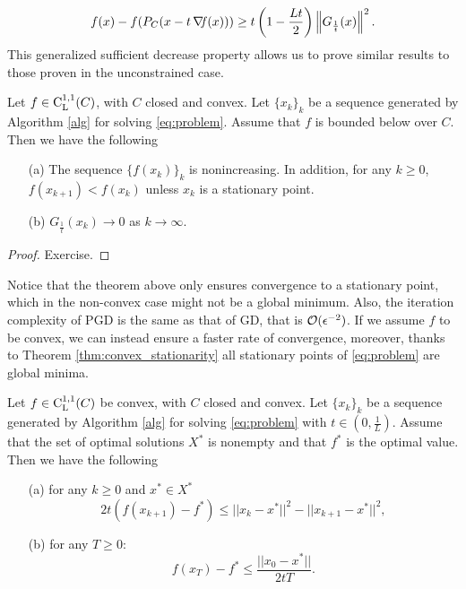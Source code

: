 \documentclass[10pt,a4paper]{article}
\begin{document}
\begin{equation*}
	f(x)-f(P_C(x-t\operatorname*{\mathit{\nabla \!f}}(x))) \geq t\left(1- \frac{Lt}{2}\right) \left\| G_{\frac{1}{t}} (x) \right\|^2.
\end{equation*}
This generalized sufficient decrease property allows us to prove similar results to those proven in the unconstrained case.
\begin{theorem}
	Let $f\in \mathord{\mathrm{C^{1,1}_{L}}}(C)$, with $C$ closed and convex. Let $\{x_k\}_k$ be a sequence generated by Algorithm \ref{alg} for solving \eqref{eq:problem}. Assume that $f$ is bounded below over $C$. Then we have the following
	\begin{itemize}
		\item[(a)] The sequence $\{f(x_k)\}_k$ is nonincreasing. In addition, for any $k\geq 0$, $f(x_{k+1}) < f(x_k)$ unless $x_k$ is a stationary point.
		\item[(b)] $G_{\frac{1}{t}}(x_k) \to 0$ as $k\to \infty$.
	\end{itemize}
\end{theorem}
\begin{proof}
	Exercise.
\end{proof}
\noindent Notice that the theorem above only ensures convergence to a stationary point, which in the non-convex case might not be a global minimum. Also, the iteration complexity of PGD is the same as that of GD, that is $\mathcal{O}(\epsilon^{-2})$. If we assume $f$ to be convex, we can instead ensure a faster rate of convergence, moreover, thanks to Theorem \ref{thm:convex_stationarity} all stationary points of \eqref{eq:problem} are global minima.
\begin{theorem}
	Let $f\in \mathord{\mathrm{C^{1,1}_{L}}}(C)$ be convex, with $C$ closed and convex. Let $\{x_k\}_k$ be a sequence generated by Algorithm \ref{alg} for solving \eqref{eq:problem} with $t\in (0,\frac{1}{L})$. Assume that the set of optimal solutions $X^*$ is nonempty and that $f^*$ is the optimal value. Then we have the following
	\begin{itemize}
		\item[(a)] for any $k\geq0$ and $x^*\in X^*$
		\begin{equation*}
			2t(f(x_{k+1}) -f^*) \leq ||x_k-x^*||^2 - ||x_{k+1}-x^*||^2,
		\end{equation*}
		\item[(b)] for any $T\geq 0$:
		\begin{equation*}
			f(x_T)-f^*\leq \frac{||x_0-x^*||}{2tT}.
		\end{equation*}
	\end{itemize}
\end{theorem}
\end{document}
